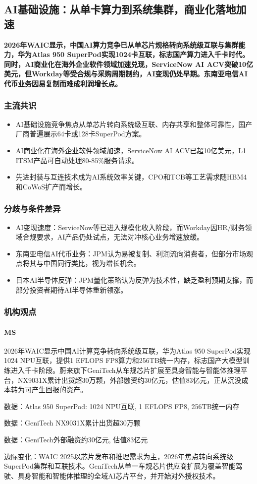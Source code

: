 \documentclass[11pt]{ctexart}
\begin{document}
\subsection{AI基础设施：从单卡算力到系统集群，商业化落地加速}
\textbf{2026年WAIC显示，中国AI算力竞争已从单芯片规格转向系统级互联与集群能力，华为Atlas 950 SuperPod实现1024卡互联，标志国产算力进入千卡时代。同时，AI商业化在海外企业软件领域加速兑现，ServiceNow AI ACV突破10亿美元，但Workday等受合规与采购周期制约，AI变现仍处早期。东南亚电信AI代币业务因易复制而难成利润增长点。}
\subsubsection*{主流共识}
\begin{itemize}
  \item AI基础设施竞争焦点从单芯片转向系统级互联、内存共享和整体可靠性，国产厂商普遍展示64卡或128卡SuperPod方案。
  \item AI商业化在海外企业软件领域加速，ServiceNow AI ACV已超10亿美元，L1 ITSM产品可自动处理80-85\%服务请求。
  \item 先进封装与互连技术成为AI系统效率关键，CPO和TCB等工艺需求随HBM4和CoWoS扩产而增长。
\end{itemize}
\subsubsection*{分歧与条件差异}
\begin{itemize}
  \item AI变现速度：ServiceNow等已进入规模化收入阶段，而Workday因HR/财务领域合规要求，AI产品仍处试点，无法对冲核心业务增速放缓。
  \item 东南亚电信AI代币业务：JPM认为易被复制、利润流向消费者，但部分市场观点将其与中国同行类比，视为增长机会。
  \item 日本AI半导体反弹：JPM量化策略认为反弹为技术性，缺乏盈利预期支撑，而部分投资者期待AI半导体重新领涨。
\end{itemize}
\subsubsection*{机构观点}
\paragraph{MS} 2026年WAIC显示中国AI计算竞争转向系统级互联，华为Atlas 950 SuperPod实现1024 NPU互联，提供1 EFLOPS FP8算力和256TB统一内存，标志国产大模型训练进入千卡阶段。蔚来旗下GeniTech从车规芯片扩展至具身智能与智能体推理平台，NX9031X累计出货超30万颗，外部融资约30亿元，估值83亿元，正从沉没成本转为可产生回报的资产。
{\small\color{refgray}数据：Atlas 950 SuperPod: 1024 NPU互联, 1 EFLOPS FP8, 256TB统一内存\par}
{\small\color{refgray}数据：GeniTech NX9031X累计出货超30万颗\par}
{\small\color{refgray}数据：GeniTech外部融资约30亿元, 估值83亿元\par}
{\small\color{refgray}边际变化：WAIC 2025以芯片发布和推理需求为主，2026年焦点转向系统级SuperPod集群和互联技术。GeniTech从单一车规芯片供应商扩展为覆盖智能驾驶、具身智能和智能体推理的全域AI芯片平台，并开始对外授权技术。\par}
\end{document}
